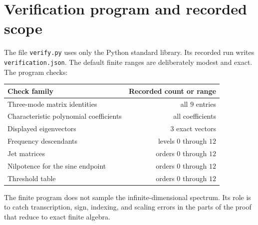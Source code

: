 \documentclass[11pt,a4paper]{article}
\theoremstyle{definition}
\theoremstyle{remark}
\begin{document}
\section{Verification program and recorded scope}
\label{app:verification}
The file \texttt{verify.py} uses only the Python standard library.  Its
recorded run writes \texttt{verification.json}.  The default finite ranges
are deliberately modest and exact.  The program checks:
\begin{center}
\small
\begin{tabular}{lr}
\toprule
Check family & Recorded count or range\\
\midrule
Three-mode matrix identities & all $9$ entries\\
Characteristic polynomial coefficients & all coefficients\\
Displayed eigenvectors & $3$ exact vectors\\
Frequency descendants & levels $0$ through $12$\\
Jet matrices & orders $0$ through $12$\\
Nilpotence for the sine endpoint & orders $0$ through $12$\\
Threshold table & orders $0$ through $12$\\
\bottomrule
\end{tabular}
\end{center}
The finite program does not sample the infinite-dimensional spectrum.  Its
role is to catch transcription, sign, indexing, and scaling errors in the
parts of the proof that reduce to exact finite algebra.
\end{document}
